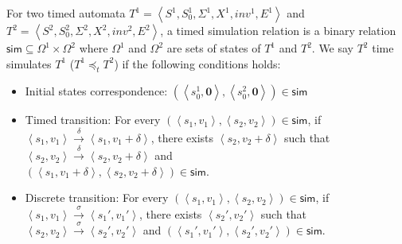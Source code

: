 For two timed automata $T^1=\left\langle S^1,S_0^1,\Sigma^1,X^1,inv^1,E^1\right\rangle$ and $T^2=\left\langle S^2,S_0^2,\Sigma^2,X^2,inv^2,E^2\right\rangle$, a timed simulation relation is a binary relation $\textsf{sim}\subseteq \Omega^1\times \Omega^2$ where $\Omega^1$ and $\Omega^2$ are sets of states of $T^1$ and $T^2$. We say $T^2$ \textsf{time simulates} $T^1$ ($T^1 \preceq_t T^2$) if the following conditions holds:
\begin{itemize}
	\item Initial states correspondence: $(\left\langle s_0^1,\textbf{0}\right\rangle,\left\langle s_0^2,\textbf{0}\right\rangle)\in \textsf{sim}$
	\item Timed transition: For every $(\left\langle s_1,v_1\right\rangle,\left\langle s_2,v_2\right\rangle)\in\textsf{sim}$, if $\left\langle s_1,v_1\right\rangle\xrightarrow{\delta}\left\langle s_1,v_1+\delta\right\rangle$, there exists $\left\langle s_2,v_2+\delta\right\rangle$ such that $\left\langle s_2,v_2\right\rangle\xrightarrow{\delta}\left\langle s_2,v_2+\delta\right\rangle$ and \\$(\left\langle s_1,v_1+\delta\right\rangle,\left\langle s_2,v_2+\delta\right\rangle)\in\textsf{sim}$.
	\item Discrete transition: For every $(\left\langle s_1,v_1\right\rangle,\left\langle s_2,v_2\right\rangle)\in\textsf{sim}$, if $\left\langle s_1,v_1\right\rangle\xrightarrow{\sigma}\left\langle s_1',v_1'\right\rangle$, there exists $\left\langle s_2',v_2'\right\rangle$ such that $\left\langle s_2,v_2\right\rangle\xrightarrow{\sigma}\left\langle s_2',v_2'\right\rangle$ and $(\left\langle s_1',v_1'\right\rangle,\left\langle s_2',v_2'\right\rangle)\in\textsf{sim}$.
\end{itemize}


 